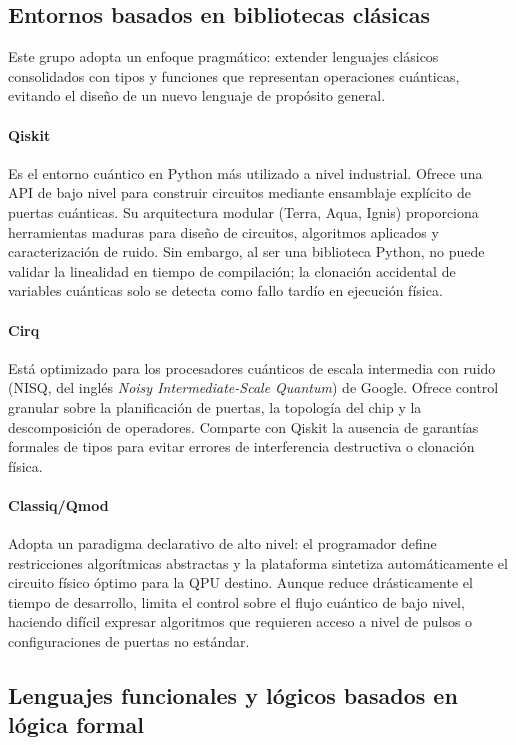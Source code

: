 \subsection{Entornos basados en bibliotecas clásicas}

Este grupo adopta un enfoque pragmático: extender lenguajes clásicos consolidados con tipos y funciones que representan operaciones cuánticas, evitando el diseño de un nuevo lenguaje de propósito general.

\paragraph{Qiskit}
Es el entorno cuántico en Python más utilizado a nivel industrial. Ofrece una API de bajo nivel para construir circuitos mediante ensamblaje explícito de puertas cuánticas. Su arquitectura modular (Terra, Aqua, Ignis) proporciona herramientas maduras para diseño de circuitos, algoritmos aplicados y caracterización de ruido. Sin embargo, al ser una biblioteca Python, no puede validar la linealidad en tiempo de compilación; la clonación accidental de variables cuánticas solo se detecta como fallo tardío en ejecución física.

\paragraph{Cirq}
Está optimizado para los procesadores cuánticos de escala intermedia con ruido (NISQ, del inglés \textit{Noisy Intermediate-Scale Quantum}) de Google. Ofrece control granular sobre la planificación de puertas, la topología del chip y la descomposición de operadores. Comparte con Qiskit la ausencia de garantías formales de tipos para evitar errores de interferencia destructiva o clonación física.

\paragraph{Classiq/Qmod}
Adopta un paradigma declarativo de alto nivel: el programador define restricciones algorítmicas abstractas y la plataforma sintetiza automáticamente el circuito físico óptimo para la QPU destino. Aunque reduce drásticamente el tiempo de desarrollo, limita el control sobre el flujo cuántico de bajo nivel, haciendo difícil expresar algoritmos que requieren acceso a nivel de pulsos o configuraciones de puertas no estándar.

\subsection{Lenguajes funcionales y lógicos basados en lógica formal}

